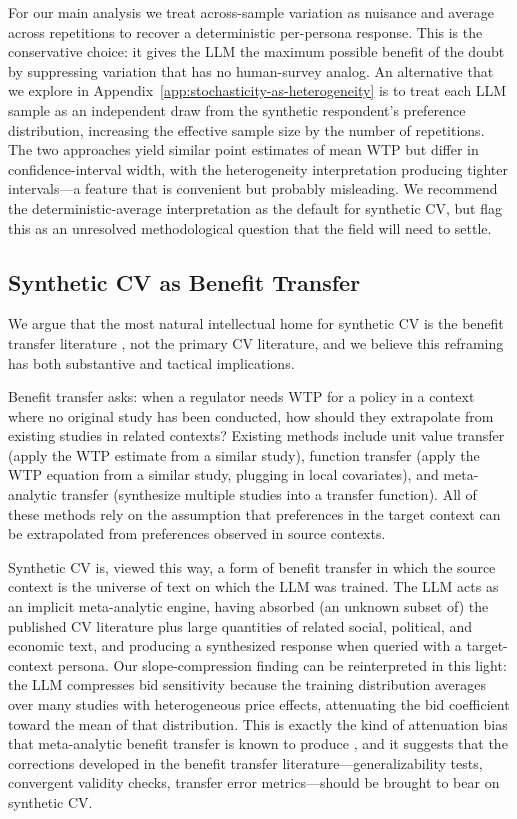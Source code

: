 \documentclass[12pt]{article}
\begin{document}
For our main analysis we treat across-sample variation as nuisance and average across repetitions to recover a deterministic per-persona response. This is the conservative choice: it gives the LLM the maximum possible benefit of the doubt by suppressing variation that has no human-survey analog. An alternative that we explore in Appendix~\ref{app:stochasticity-as-heterogeneity} is to treat each LLM sample as an independent draw from the synthetic respondent's preference distribution, increasing the effective sample size by the number of repetitions. The two approaches yield similar point estimates of mean WTP but differ in confidence-interval width, with the heterogeneity interpretation producing tighter intervals---a feature that is convenient but probably misleading. We recommend the deterministic-average interpretation as the default for synthetic CV, but flag this as an unresolved methodological question that the field will need to settle.

\subsection{Synthetic CV as Benefit Transfer}\label{sec:disc-benefit-transfer}

We argue that the most natural intellectual home for synthetic CV is the benefit transfer literature \parencite{Rosenberger2017, Loomis2015, Boyle2010}, not the primary CV literature, and we believe this reframing has both substantive and tactical implications.

Benefit transfer asks: when a regulator needs WTP for a policy in a context where no original study has been conducted, how should they extrapolate from existing studies in related contexts? Existing methods include unit value transfer (apply the WTP estimate from a similar study), function transfer (apply the WTP equation from a similar study, plugging in local covariates), and meta-analytic transfer (synthesize multiple studies into a transfer function). All of these methods rely on the assumption that preferences in the target context can be extrapolated from preferences observed in source contexts.

Synthetic CV is, viewed this way, a form of benefit transfer in which the source context is the universe of text on which the LLM was trained. The LLM acts as an implicit meta-analytic engine, having absorbed (an unknown subset of) the published CV literature plus large quantities of related social, political, and economic text, and producing a synthesized response when queried with a target-context persona. Our slope-compression finding can be reinterpreted in this light: the LLM compresses bid sensitivity because the training distribution averages over many studies with heterogeneous price effects, attenuating the bid coefficient toward the mean of that distribution. This is exactly the kind of attenuation bias that meta-analytic benefit transfer is known to produce \parencite{Bergstrom2008}, and it suggests that the corrections developed in the benefit transfer literature---generalizability tests, convergent validity checks, transfer error metrics---should be brought to bear on synthetic CV.
\end{document}
